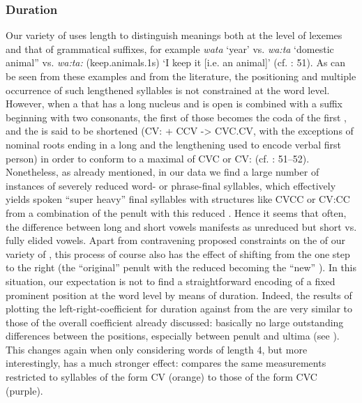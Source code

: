 \documentclass[output=paper]{LSP/langsci}
\begin{document}
\subsubsection{Duration}
Our variety of  uses  length to distinguish meanings both at the level of lexemes and that of grammatical suffixes, for example \textit{wata} `year' vs. \textit{wa\textipa:ta} `domestic animal” vs. \textit{wa\textipa:ta\textipa:} (keep.animals.1s) `I keep it [i.e. an animal]' (cf. \citealt{Parker1976}: 51). As can be seen from these examples and from the literature, the positioning and multiple occurrence of such lengthened syllables is not constrained at the word level. However, when a  that has a long nucleus and is open is combined with a suffix beginning with two consonants, the first of those becomes the coda of the first , and the  is said to be shortened (CV\textipa: + CCV -> CVC.CV, with the exceptions of nominal roots ending in a long  and the  lengthening used to encode verbal first person) in order to conform to a maximal  of CVC or CV\textipa: (cf. \citealt{Parker1976}: 51–52). Nonetheless, as already mentioned, in our data we find a large number of instances of severely reduced word- or phrase-final syllables, which effectively yields spoken “super heavy” final syllables with structures like CVCC or CV\textipa:CC from a combination of the penult with this reduced . Hence it seems that often, the difference between long and short vowels manifests as unreduced but short vs. fully elided vowels. Apart from contravening proposed constraints on the  of our variety of , this process of course also has the effect of shifting  from the  one step to the right (the “original” penult with the reduced  becoming the “new” ). In this situation, our expectation is not to find a straightforward encoding of a fixed prominent position at the word level by means of duration. Indeed, the results of plotting the left-right-coefficient for duration against  from the  are very similar to those of the overall coefficient already discussed: basically no large outstanding differences between the positions, especially between penult and ultima (see ). This changes again when only considering words of length 4, but more interestingly,  has a much stronger effect:  compares the same measurements restricted to syllables of the form CV (orange) to those of the form CVC (purple).\largerpage[-1]   
\end{document}
